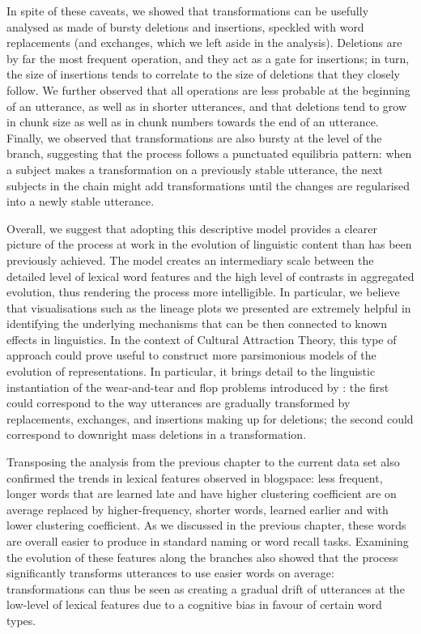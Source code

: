 \documentclass[a4paper,fleqn]{cas-dc}
\begin{document}
In spite of these caveats, we showed that transformations can be
usefully analysed as made of bursty deletions and insertions, speckled
with word replacements (and exchanges, which we left aside in the
analysis). Deletions are by far the most frequent operation, and they
act as a gate for insertions; in turn, the size of insertions tends to
correlate to the size of deletions that they closely follow. We further
observed that all operations are less probable at the beginning of an
utterance, as well as in shorter utterances, and that deletions tend to
grow in chunk size as well as in chunk numbers towards the end of an
utterance. Finally, we observed that transformations are also bursty at
the level of the branch, suggesting that the process follows a
punctuated equilibria pattern: when a subject makes a transformation on
a previously stable utterance, the next subjects in the chain might add
transformations until the changes are regularised into a newly stable
utterance.

Overall, we suggest that adopting this descriptive model provides a
clearer picture of the process at work in the evolution of linguistic
content than has been previously achieved. The model creates an
intermediary scale between the detailed level of lexical word features
and the high level of contrasts in aggregated evolution, thus rendering
the process more intelligible. In particular, we believe that
visualisations such as the lineage plots we presented are extremely
helpful in identifying the underlying mechanisms that can be then
connected to known effects in linguistics. In the context of Cultural
Attraction Theory, this type of approach could prove useful to construct
more parsimonious models of the evolution of representations. In
particular, it brings detail to the linguistic instantiation of the
wear-and-tear and flop problems introduced by \citet{morin_how_2016}:
the first could correspond to the way utterances are gradually
transformed by replacements, exchanges, and insertions making up for
deletions; the second could correspond to downright mass deletions in a
transformation.

Transposing the analysis from the previous chapter to the current data
set also confirmed the trends in lexical features observed in blogspace:
less frequent, longer words that are learned late and have higher
clustering coefficient are on average replaced by higher-frequency,
shorter words, learned earlier and with lower clustering coefficient. As
we discussed in the previous chapter, these words are overall easier to
produce in standard naming or word recall tasks. Examining the evolution
of these features along the branches also showed that the process
significantly transforms utterances to use easier words on average:
transformations can thus be seen as creating a gradual drift of
utterances at the low-level of lexical features due to a cognitive bias
in favour of certain word types.
\end{document}
